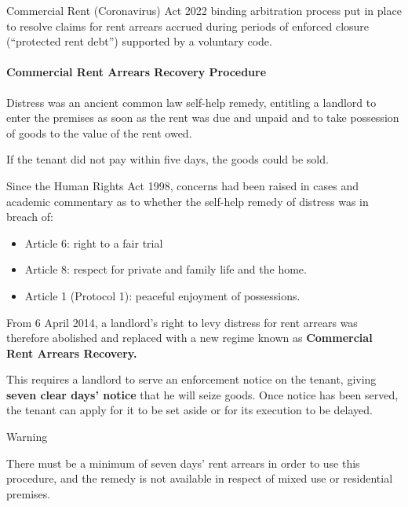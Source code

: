 \documentclass[
]{article}
\providecommand{\tightlist}{%
  \setlength{\itemsep}{0pt}\setlength{\parskip}{0pt}}
\newenvironment{env-1183acc6-7dc8-44d4-a985-6dec306e67fd}
{
    \savenotes\tcolorbox[blanker,breakable,left=5pt,borderline west={2pt}{-4pt}{orange}]
}
{
    \endtcolorbox\spewnotes
}
\begin{document}
Commercial Rent (Coronavirus) Act 2022 binding arbitration process put
in place to resolve claims for rent arrears accrued during periods of
enforced closure (``protected rent debt'') supported by a voluntary
code.

\hypertarget{commercial-rent-arrears-recovery-procedure}{%
\paragraph{Commercial Rent Arrears Recovery
Procedure}\label{commercial-rent-arrears-recovery-procedure}}

Distress was an ancient common law self-help remedy, entitling a
landlord to enter the premises as soon as the rent was due and unpaid
and to take possession of goods to the value of the rent owed.

If the tenant did not pay within five days, the goods could be sold.

Since the Human Rights Act 1998, concerns had been raised in cases and
academic commentary as to whether the self-help remedy of distress was
in breach of:

\begin{itemize}
\tightlist
\item
  Article 6: right to a fair trial
\item
  Article 8: respect for private and family life and the home.
\item
  Article 1 (Protocol 1): peaceful enjoyment of possessions.
\end{itemize}

From 6 April 2014, a landlord's right to levy distress for rent arrears
was therefore abolished and replaced with a new regime known as
\textbf{Commercial Rent Arrears Recovery.}

This requires a landlord to serve an enforcement notice on the tenant,
giving \textbf{seven clear days' notice} that he will seize goods. Once
notice has been served, the tenant can apply for it to be set aside or
for its execution to be delayed.

\begin{env-1183acc6-7dc8-44d4-a985-6dec306e67fd}

Warning

There must be a minimum of seven days' rent arrears in order to use this
procedure, and the remedy is not available in respect of mixed use or
residential premises.

\end{env-1183acc6-7dc8-44d4-a985-6dec306e67fd}
\end{document}

